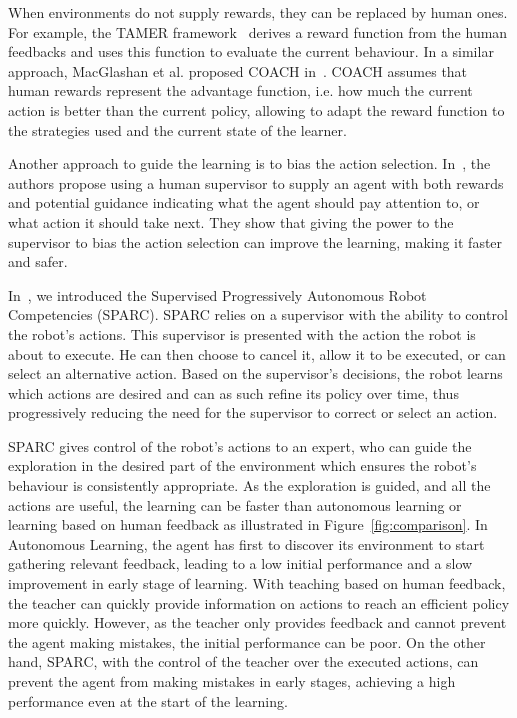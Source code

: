 \documentclass[letterpaper]{article} %
\begin{document}
When environments do not supply rewards, they can be replaced by human ones. For
example, the TAMER framework~\cite{knox2009interactively} derives a reward
function from the human feedbacks and uses this function to evaluate the current
behaviour. In a similar approach, MacGlashan et al. proposed COACH
in~\cite{macglashan2017interactive}. COACH assumes that human rewards represent
the advantage function, i.e. how much the current action is better than the
current policy, allowing to adapt the reward function to the strategies used and
the current state of the learner.

Another approach to guide the learning is to bias the action selection.
In~\cite{thomaz2008teachable}, the authors propose using a human supervisor to
supply an agent with both rewards and potential guidance indicating what the
agent should pay attention to, or what action it should take next. They show
that giving the power to the supervisor to bias the action selection can improve
the learning, making it faster and safer.

In~\cite{senft2015sparc}, we introduced the Supervised Progressively Autonomous
Robot Competencies (SPARC). SPARC relies on a supervisor with the ability to
control the robot's actions. This supervisor is presented with the action the
robot is about to execute. He can then choose to cancel it, allow it to be
executed, or can select an alternative action. Based on the supervisor's
decisions, the robot learns which actions are desired and can as such refine its
policy over time, thus progressively reducing the need for the supervisor to correct or select an
action.

SPARC gives control of the robot's actions to an expert, who can guide the
exploration in the desired part of the environment which ensures the robot's
behaviour is consistently appropriate. As the exploration is guided, and all the
actions are useful, the learning can be faster than autonomous learning or
learning based on human feedback as illustrated in Figure~\ref{fig:comparison}.
In Autonomous Learning, the agent has first to discover its environment to start
gathering relevant feedback, leading to a low initial performance and a slow
improvement in early stage of learning. With teaching based on human
feedback, the teacher can quickly provide information on actions to reach an efficient policy more
quickly. However, as the teacher only provides feedback and
cannot prevent the agent making mistakes, the initial performance can be poor.
On the other hand, SPARC, with the control of the teacher over the executed
actions, can prevent the agent from making mistakes in early stages, achieving a high
performance even at the start of the learning. 
\end{document}

